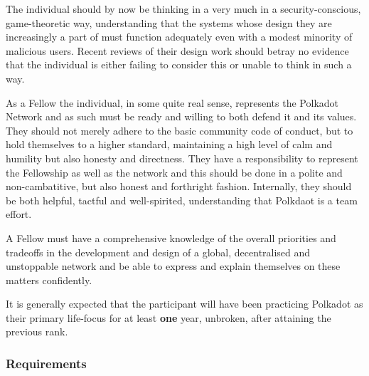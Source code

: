\documentclass[9pt,oneside]{amsart}
\begin{document}
The individual should by now be thinking in a very much in a security-conscious, game-theoretic way, understanding that the systems whose design they are increasingly a part of must function adequately even with a modest minority of malicious users. Recent reviews of their design work should betray no evidence that the individual is either failing to consider this or unable to think in such a way.

As a Fellow the individual, in some quite real sense, represents the Polkadot Network and as such must be ready and willing to both defend it and its values. They should not merely adhere to the basic community code of conduct, but to hold themselves to a higher standard, maintaining a high level of calm and humility but also honesty and directness. They have a responsibility to represent the Fellowship as well as the network and this should be done in a polite and non-cambatitive, but also honest and forthright fashion. Internally, they should be both helpful, tactful and well-spirited, understanding that Polkdaot is a team effort.

A Fellow must have a comprehensive knowledge of the overall priorities and tradeoffs in the development and design of a global, decentralised and unstoppable network and be able to express and explain themselves on these matters confidently.

It is generally expected that the participant will have been practicing Polkadot as their primary life-focus for at least \textbf{one} year, unbroken, after attaining the previous rank.

\subsubsection{Requirements}\label{requirements-3}
\end{document}
